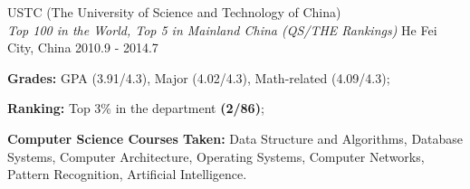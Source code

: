 \begin{cventries}
    {USTC (The University of Science and Technology of China) \\ {\fontsize{10pt}{1em}\itshape Top 100 in the World, Top 5 in Mainland China (QS/THE Rankings)}}%
    {He Fei City, China}%
    {2010.9 - 2014.7}%
    {
      \begin{cvitems}
        \item \textbf{Grades:} GPA (3.91/4.3), Major (4.02/4.3), Math-related (4.09/4.3);
        \item \textbf{Ranking:} Top 3\% in the department \textbf{(2/86)};
        \item \textbf{Computer Science Courses Taken:} Data Structure and Algorithms, Database Systems, Computer Architecture, Operating Systems, Computer Networks, Pattern Recognition, Artificial Intelligence.
      \end{cvitems}
    }
\end{cventries}
